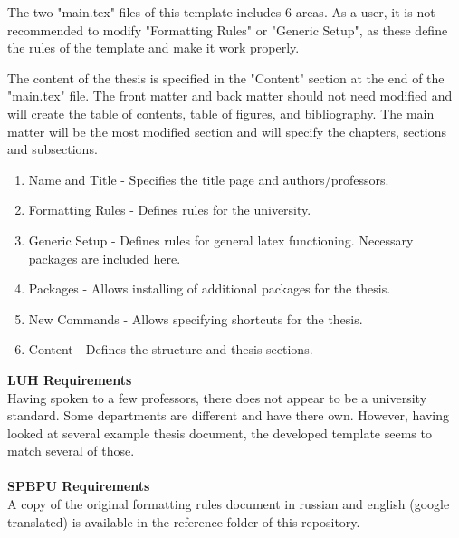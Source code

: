 \label{chap:guidelines}
The two "main.tex" files of this template includes 6 areas. As a user, it is not recommended to modify "Formatting Rules" or "Generic Setup", as these define the rules of the template and make it work properly.

The content of the thesis is specified in the "Content" section at the end of the "main.tex" file. The front matter and back matter should not need modified and will create the table of contents, table of figures, and bibliography. The main matter will be the most modified section and will specify the chapters, sections and subsections.

\begin{enumerate}
    \item Name and Title - Specifies the title page and authors/professors.
    \item Formatting Rules - Defines rules for the university.
    \item Generic Setup - Defines rules for general latex functioning. Necessary packages are included here.
    \item Packages - Allows installing of additional packages for the thesis.
    \item New Commands - Allows specifying shortcuts for the thesis.
    \item Content - Defines the structure and thesis sections.
\end{enumerate}


\textbf{LUH Requirements}\\
Having spoken to a few professors, there does not appear to be a university standard. Some departments are different and have there own. However, having looked at several example thesis document, the developed template seems to match several of those.
\\\\
\textbf{SPBPU Requirements}\\
A copy of the original formatting rules document\cite{Polytech2018} in russian and english (google translated) is available in the reference folder of this repository.
